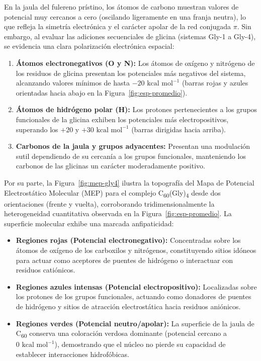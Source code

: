 En la jaula del fulereno prístino, los átomos de carbono muestran valores de potencial muy cercanos a cero (oscilando ligeramente en una franja neutra), lo que refleja la simetría electrónica y el carácter apolar de la red conjugada $\pi$. Sin embargo, al evaluar las adiciones secuenciales de glicina (sistemas Gly-1 a Gly-4), se evidencia una clara polarización electrónica espacial:
\begin{enumerate}
    \item \textbf{Átomos electronegativos (O y N):} Los átomos de oxígeno y nitrógeno de los residuos de glicina presentan los potenciales más negativos del sistema, alcanzando valores mínimos de hasta $-20\text{ kcal mol}^{-1}$ (barras rojas y azules orientadas hacia abajo en la Figura~\ref{fig:esp-promedio}).
    \item \textbf{Átomos de hidrógeno polar (H):} Los protones pertenecientes a los grupos funcionales de la glicina exhiben los potenciales más electropositivos, superando los $+20$ y $+30\text{ kcal mol}^{-1}$ (barras dirigidas hacia arriba).
    \item \textbf{Carbonos de la jaula y grupos adyacentes:} Presentan una modulación sutil dependiendo de su cercanía a los grupos funcionales, manteniendo los carbonos de las glicinas un carácter moderadamente positivo.
\end{enumerate}

Por su parte, la Figura~\ref{fig:mep-gly4} ilustra la topografía del Mapa de Potencial Electrostático Molecular (MEP) para el complejo C\textsubscript{60}(Gly)\textsubscript{4} desde dos orientaciones (frente y vuelta), corroborando tridimensionalmente la heterogeneidad cuantitativa observada en la Figura~\ref{fig:esp-promedio}. La superficie molecular exhibe una marcada anfipaticidad:
\begin{itemize}
    \item \textbf{Regiones rojas (Potencial electronegativo):} Concentradas sobre los átomos de oxígeno de los carboxilos y nitrógenos, constituyendo sitios idóneos para actuar como aceptores de puentes de hidrógeno o interactuar con residuos catiónicos.
    \item \textbf{Regiones azules intensas (Potencial electropositivo):} Localizadas sobre los protones de los grupos funcionales, actuando como donadores de puentes de hidrógeno y sitios de atracción electrostática hacia residuos aniónicos.
    \item \textbf{Regiones verdes (Potencial neutro/apolar):} La superficie de la jaula de C\textsubscript{60} conserva una coloración verdosa dominante (potencial cercano a $0\text{ kcal mol}^{-1}$), demostrando que el núcleo no pierde su capacidad de establecer interacciones hidrofóbicas.
\end{itemize}

